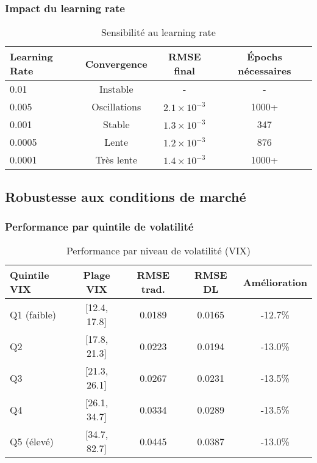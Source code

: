 \subsubsection{Impact du learning rate}

\begin{table}[H]
\centering
\caption{Sensibilité au learning rate}
\begin{tabular}{@{}lccc@{}}
\toprule
\textbf{Learning Rate} & \textbf{Convergence} & \textbf{RMSE final} & \textbf{Épochs nécessaires} \\
\midrule
0.01 & Instable & - & - \\
0.005 & Oscillations & $2.1 \times 10^{-3}$ & 1000+ \\
0.001 & Stable & $1.3 \times 10^{-3}$ & 347 \\
0.0005 & Lente & $1.2 \times 10^{-3}$ & 876 \\
0.0001 & Très lente & $1.4 \times 10^{-3}$ & 1000+ \\
\bottomrule
\end{tabular}
\end{table}

\subsection{Robustesse aux conditions de marché}

\subsubsection{Performance par quintile de volatilité}

\begin{table}[H]
\centering
\caption{Performance par niveau de volatilité (VIX)}
\begin{tabular}{@{}lcccc@{}}
\toprule
\textbf{Quintile VIX} & \textbf{Plage VIX} & \textbf{RMSE trad.} & \textbf{RMSE DL} & \textbf{Amélioration} \\
\midrule
Q1 (faible) & [12.4, 17.8] & 0.0189 & 0.0165 & -12.7\% \\
Q2 & [17.8, 21.3] & 0.0223 & 0.0194 & -13.0\% \\
Q3 & [21.3, 26.1] & 0.0267 & 0.0231 & -13.5\% \\
Q4 & [26.1, 34.7] & 0.0334 & 0.0289 & -13.5\% \\
Q5 (élevé) & [34.7, 82.7] & 0.0445 & 0.0387 & -13.0\% \\
\bottomrule
\end{tabular}
\end{table}


